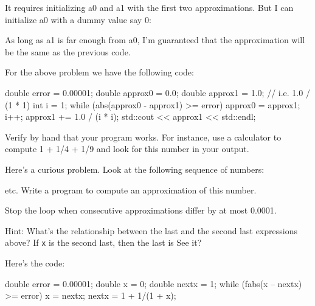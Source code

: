 It requires initializing a0 and a1 with the first two approximations.
But I can initialize a0 with a dummy value say 0:


As long as a1 is far enough from a0, I'm guaranteed that
the approximation will be the same as the previous code.

For the above problem we have the following code:
\begin{console}
double error = 0.00001;
double approx0 = 0.0;
double approx1 = 1.0; // i.e. 1.0 / (1 * 1)
int i = 1;
while (abs(approx0 - approx1) >= error)
{     
      approx0 = approx1;
      i++;
      approx1 += 1.0 / (i * i);
      std::cout << approx1 << std::endl;
}
\end{console}

Verify by hand that your program works. For instance, use a calculator
to compute 1 + 1/4 + 1/9 and look for this number in your output.

Here's a curious problem. Look at the following sequence
of numbers:


etc. Write a program to compute an approximation of this number.

Stop the loop when consecutive approximations differ by at most 0.0001.

Hint: What's the relationship between the last and the
second last expressions above? If \texttt{x} is the second last, then the
last is
See it?

Here's the code:
\begin{console}
double error = 0.00001;
double x = 0;
double nextx = 1;
while (fabs(x -- nextx) >= error)
{     
      x = nextx;
      nextx = 1 + 1/(1 + x);
}
\end{console}

